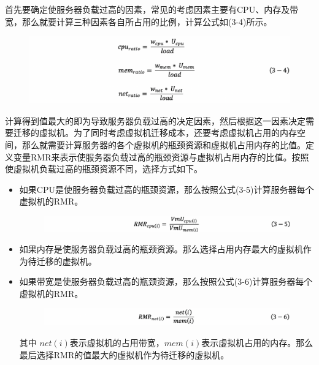 首先要确定使服务器负载过高的因素，常见的考虑因素主要有CPU、内存及带宽，那么就要计算三种因素各自所占用的比例，计算公式如(3-4)所示。

 \begin{figure}[!htb]
  \centering
  \includegraphics[width=0.95\linewidth]{./Figure/IMG_Chap3_9.png}
\end{figure}

计算得到值最大的即为导致服务器负载过高的决定因素，然后根据这一因素决定需要迁移的虚拟机。为了同时考虑虚拟机迁移成本，还要考虑虚拟机占用的内存空间，那么就需要计算服务器的各个虚拟机的瓶颈资源和虚拟机占用内存的比值。定义变量RMR来表示使服务器负载过高的瓶颈资源与虚拟机占用内存的比值。按照使虚拟机负载过高的瓶颈资源不同，选择方式如下。

\begin{itemize}
 \item 如果CPU是使服务器负载过高的瓶颈资源，那么按照公式(3-5)计算服务器每个虚拟机的RMR。

        \begin{figure}[!htb]
          \centering
          \includegraphics[width=0.95\linewidth]{./Figure/IMG_Chap3_10.png}
        \end{figure}

 \item 如果内存是使服务器负载过高的瓶颈资源。那么选择占用内存最大的虚拟机作为待迁移的虚拟机。
 \item 如果带宽是使服务器负载过高的瓶颈资源，那么按照公式(3-6)计算服务器每个虚拟机的RMR。

        \begin{figure}[!htb]
          \centering
          \includegraphics[width=0.95\linewidth]{./Figure/IMG_Chap3_11.png}
        \end{figure}

        其中 $ net(i) $表示虚拟机的占用带宽，$ mem(i) $表示虚拟机占用的内存。那么最后选择RMR的值最大的虚拟机作为待迁移的虚拟机。
 \end{itemize}

